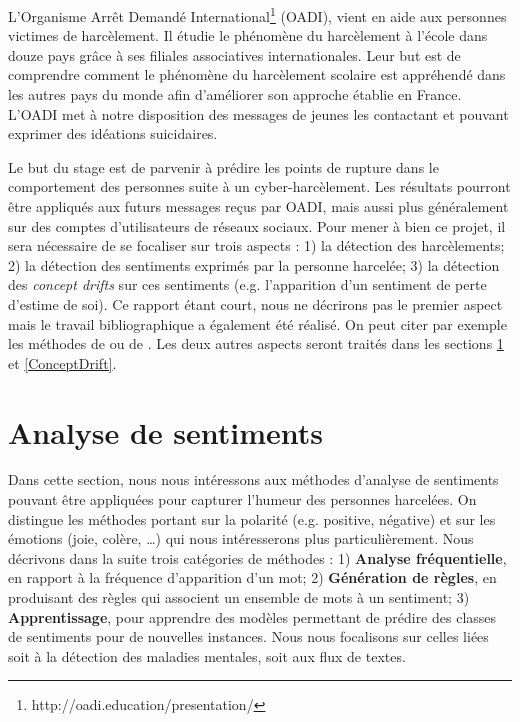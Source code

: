 \documentclass[utf8]{stageM2R} %
\theoremstyle{remark}
\renewcommand{\emph}{\textbf}
\begin{document}
L'Organisme Arrêt Demandé International\footnote{http://oadi.education/presentation/} (OADI), vient en aide aux personnes victimes de harcèlement. Il étudie le phénomène du harcèlement à l'école dans douze pays grâce à ses filiales associatives internationales. Leur but est de comprendre comment le phénomène du harcèlement scolaire est appréhendé dans les autres pays du monde afin d'améliorer son approche établie en France. L'OADI met à notre disposition des messages de jeunes les contactant et pouvant exprimer des idéations suicidaires. 

Le but du stage est de parvenir à prédire les points de rupture dans le comportement des personnes suite à un cyber-harcèlement. Les résultats pourront être appliqués aux futurs messages reçus par OADI, mais aussi plus généralement sur des comptes d'utilisateurs de réseaux sociaux. Pour mener à bien ce projet, il sera nécessaire de se focaliser sur trois aspects : 1) la détection des harcèlements; 2) la détection des sentiments exprimés par la personne harcelée; 3) la détection des \textit{concept drifts} sur ces sentiments (e.g. l'apparition d'un sentiment de perte d'estime de soi). Ce rapport étant  court, nous ne décrirons pas le premier aspect mais le travail bibliographique a également été réalisé. On peut citer par exemple les  méthodes de \cite{Nahar2012} ou de  \cite{Yin2009}. Les deux autres aspects seront traités dans les sections \ref{AnalyseSemantique} et \ref{ConceptDrift}.


\chapter{Analyse de sentiments}\label{AnalyseSemantique}

Dans cette section, nous nous intéressons aux méthodes d'analyse de sentiments pouvant être appliquées pour capturer l'humeur des personnes harcelées.
On distingue les méthodes portant sur la polarité (e.g. positive, négative) et sur les émotions (joie, colère,  \dots) qui nous intéresserons plus particulièrement.
Nous décrivons dans la suite trois catégories de méthodes : 1) \emph{Analyse fréquentielle}, en rapport à la fréquence d'apparition d'un mot; 2) \emph{Génération de règles}, en produisant des règles qui associent un ensemble de mots à un sentiment; 3) \emph{Apprentissage}, pour apprendre  des modèles permettant de prédire des classes de sentiments pour de nouvelles instances. Nous  nous focalisons sur celles liées soit à la détection des maladies mentales, soit aux flux de textes.
\end{document}
